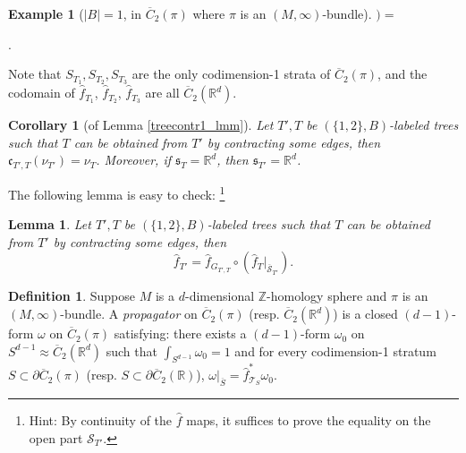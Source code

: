 \documentclass[11pt]{article}
\newtheorem{lmm}[thm]{Lemma}
\newtheorem{crl}[thm]{Corollary}
\theoremstyle{definition}
\newtheorem{dfn}[thm]{Definition}
\newtheorem{eg}[thm]{Example}
\theoremstyle{remark}
\def\ov#1{\overline{#1}}
\def\Z{\mathbb{Z}}
\def\R{\mathbb{R}}
\def\fc{\mathfrak{c}}
\def\fs{\mathfrak{s}}
\def\cT{\mathcal{T}}
\def\cS{\mathcal{S}}
\begin{document}
\begin{eg}[$|B|=1$, in $\ov{C}_2(\pi)$ where $\pi$ is an $(M,\infty)$-bundle]
$)=$
. 

Note that $S_{T_1},S_{T_2},S_{T_3}$ are the only codimension-1 strata of $\ov{C}_2(\pi)$, and the codomain of $\hat{f}_{T_1}$, $\hat{f}_{T_2}$, $\hat{f}_{T_3}$ are all $\ov{C}_2(\R^d)$. 
\end{eg}

\begin{crl}[of Lemma \ref{treecontr1_lmm}]\label{treecontr2_crl}
Let $T',T$ be $(\{1,2\},B)$-labeled trees such that $T$ can be obtained from $T'$ by contracting some edges, then $\fc_{T',T}(\nu_{T'})=\nu_T$. 
Moreover, if $\fs_T=\R^d$, then $\fs_{T'}=\R^d$. 
\end{crl}

The following lemma is easy to check: \footnote{Hint: By continuity of the $\hat{f}$ maps, it suffices to prove the equality on the open part $\cS_{T'}$.}
\begin{lmm}\label{treecontr3_lmm}
Let $T',T$ be $(\{1,2\},B)$-labeled trees such that $T$ can be obtained from $T'$ by contracting some edges, then
$$\hat{f}_{T'}=\hat{f}_{G_{T',T}}\circ(\hat{f}_{T}|_{\ov\cS_{T'}}).$$
\end{lmm}

\begin{dfn}\label{propagator_dfn}
Suppose $M$ is a $d$-dimensional $\Z$-homology sphere and $\pi$ is an $(M,\infty)$-bundle. 
A {\it propagator} on $\ov{C}_2(\pi)$ (resp. $\ov{C}_2(\R^d)$) is a closed $(d-1)$-form $\omega$ on $\ov{C}_2(\pi)$ satisfying: there exists a $(d-1)$-form $\omega_0$ on $S^{d-1}\approx\ov{C}_2(\R^d)$ such that $\int_{S^{d-1}}\omega_0=1$ and for every codimension-1 stratum $S\subset\partial\ov{C}_2(\pi)$ (resp. $S\subset\partial\ov{C}_2(\R)$), $\omega|_{\ov{S}}=\hat{f}_{\cT_S}^*\omega_0$. 
\end{dfn}
\end{document}
